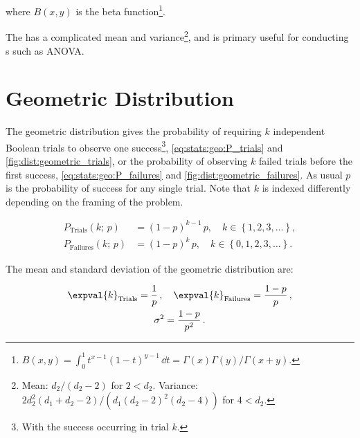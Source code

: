\noindent where $B\left(x,y\right)$ is the beta function\footnote{$B\left(x,y\right) = \int_{0}^{1} t^{x-1} \left(1-t\right)^{y-1} \, \dd{t} = \Gamma\left(x\right)\Gamma\left(y\right) / \Gamma\left(x+y\right)$.}.

The \Fdist has a complicated
mean and variance\footnote{Mean: $d_{2}/\left(d_{2}-2\right)$ for $2 < d_{2}$.
Variance: $2 d_{2}^{2}\left(d_{1}+d_{2}-2\right)/\left(d_{1}\left(d_{2}-2\right)^{2}\left(d_{2}-4\right)\right)$ for $4 < d_{2}$.},
and is primary useful for conducting {\Ftest}s such as ANOVA.

\section{Geometric Distribution}
\label{stats:geo_dist}

The geometric distribution gives the probability of
requiring $k$ independent Boolean trials to observe one success\footnote{With the success occurring in trial $k$.},
\cref{eq:stats:geo:P_trials} and \cref{fig:dist:geometric_trials},
or the probability of observing $k$ failed trials before the first success,
\cref{eq:stats:geo:P_failures} and \cref{fig:dist:geometric_failures}.
As usual $p$ is the probability of success for any single trial.
Note that $k$ is indexed differently depending on the framing of the problem.

\begin{subequations}\label{eq:stats:geo}
\begin{align}
P_{\text{Trials}}\left(k;\,p\right) &= \left(1-p\right)^{k-1}\,p,\quad k \in \left\{1,2,3,\ldots\right\}, \label{eq:stats:geo:P_trials} \\
P_{\text{Failures}}\left(k;\,p\right) &= \left(1-p\right)^{k}\,p,\quad k \in \left\{0, 1,2,3,\ldots\right\}. \label{eq:stats:geo:P_failures}
\end{align}
\end{subequations}

The mean and standard deviation of the geometric distribution are:

\begin{subequations}\label{eq:stats:geo_dist:mean_variance}
\begin{gather}
\expval{k}_{\text{Trials}} = \frac{1}{p}\,, \quad \expval{k}_{\text{Failures}} = \frac{1-p}{p}\,, \label{eq:stats:geo_dist:mean} \\
\sigma^{2} = \frac{1-p}{p^{2}}\,. \label{eq:stats:geo_dist:variance}
\end{gather}
\end{subequations}

